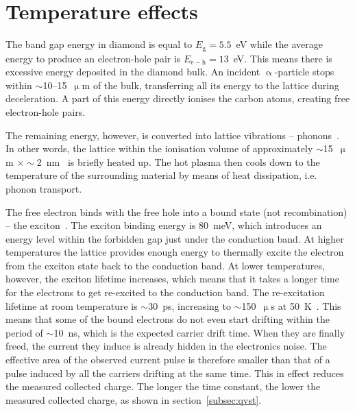 \section{Temperature effects}
The band gap energy in diamond is equal to $E_\mathrm{g}=5.5$~eV while the average energy to produce an electron-hole pair is $E_{\mathrm{e-h}}=13$~eV. This means there is excessive energy deposited in the diamond bulk. An incident $\upalpha$-particle stops within $\sim$10--15~$\upmu$m of the bulk, transferring all its energy to the lattice during deceleration. A part of this energy directly ionises the carbon atoms, creating free electron-hole pairs. 

The remaining energy, however, is converted into lattice vibrations -- phonons~\cite{PhysRevLett.13.13, Jansen:1956431}. In other words, the lattice within the ionisation volume  of approximately $\sim$15~$\upmu$m $\times\sim$2~nm~\cite{Jansen:1956431} is briefly heated up. The hot plasma then cools down to the temperature of the surrounding material by means of heat dissipation, i.e. phonon transport.

The free electron binds with the free hole into a bound state (not recombination) -- the exciton~\cite{1970PhyEd...5..226L}. The exciton binding energy is 80~meV, which introduces an energy level within the forbidden gap just under the conduction band. At higher temperatures the lattice provides enough energy to thermally excite the electron from the exciton state back to the conduction band. At lower temperatures, however, the exciton lifetime increases, which means that it takes a longer time for the electrons to get re-excited to the conduction band. The re-excitation lifetime at room temperature is $\sim$30~ps, increasing to $\sim$150~$\upmu$s at 50~K~\cite{Jansen:1956431}. This means that some of the bound electrons do not even start drifting within the period of $\sim$10~ns, which is the expected carrier drift time. When they are finally freed, the current they induce is already hidden in the electronics noise. The effective area of the observed current pulse is therefore smaller than that of a pulse induced by all the carriers drifting at the same time. This in effect reduces the measured collected charge. The longer the time constant, the lower the measured collected charge, as shown in section~\ref{subsec:qvst}.

